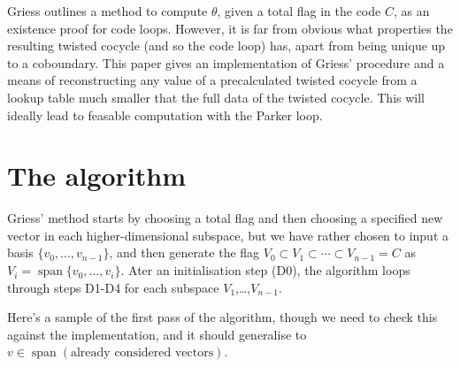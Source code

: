 \documentclass[a4paper,debug]{tufte-handout}
\theoremstyle{plain}
\theoremstyle{definition}
\theoremstyle{remark}
\DeclareMathOperator{\Span}{span}
\begin{document}
Griess outlines a method to compute $\theta$, given a total flag in the code $C$, as an existence proof for code loops.
However, it is far from obvious what properties the resulting twisted cocycle (and so the code loop) has, apart from being unique up to a coboundary.
This paper gives an implementation of Griess' procedure and a means of reconstructing any value of a precalculated twisted cocycle from a  lookup table much smaller that the full data of the twisted cocycle.
This will ideally lead to feasable computation with the Parker loop.


\section{The algorithm}

Griess' method starts by choosing a total flag and then choosing a specified new vector in each higher-dimensional subspace, but we have rather chosen to input a basis $\{v_0,\ldots,v_{n-1}\}$, and then generate the flag $V_0 \subset V_1 \subset \cdots \subset V_{n-1} = C$ as $V_i = \Span\{v_0,\ldots,v_i\}$.
Ater an initialisation step (D0), the algorithm loops through steps D1-D4 for each subspace $V_1$,\ldots,$V_{n-1}$.

Here's a sample of the first pass of the algorithm, though we need to check this against the implementation, and it should generalise to $v \in \Span(\text{already considered vectors})$.
\end{document}
